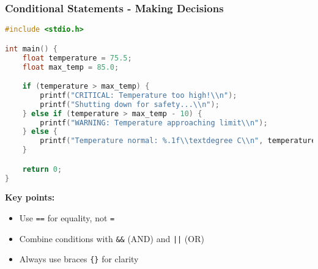 \documentclass{beamer}
\begin{document}
\begin{frame}[fragile]
\frametitle{Conditional Statements - Making Decisions}
\begin{lstlisting}[language=C]
#include <stdio.h>

int main() {
    float temperature = 75.5;
    float max_temp = 85.0;

    if (temperature > max_temp) {
        printf("CRITICAL: Temperature too high!\\n");
        printf("Shutting down for safety...\\n");
    } else if (temperature > max_temp - 10) {
        printf("WARNING: Temperature approaching limit\\n");
    } else {
        printf("Temperature normal: %.1f\\textdegree C\\n", temperature);
    }

    return 0;
}
\end{lstlisting}

\textbf{Key points:}
\begin{itemize}
    \item Use \texttt{==} for equality, not \texttt{=}
    \item Combine conditions with \texttt{\&\&} (AND) and \texttt{||} (OR)
    \item Always use braces \texttt{\{\}} for clarity
\end{itemize}
\end{frame}
\end{document}

